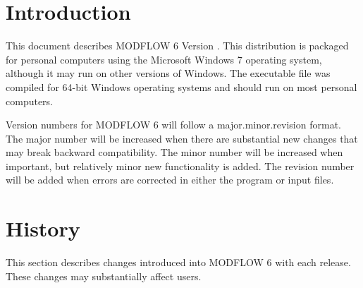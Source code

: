 \documentclass[11pt,twoside,twocolumn]{usgsreport}
\begin{document}
\ifdef{\makefrontcoveralt}{\makefrontcoveralt}{\makefrontcover}

\ifdef{\makefrontmatterabv}{\makefrontmatterabv}{\makefrontmatter}

\onecolumn
\pagestyle{body}
\RaggedRight
{}
\pagestyle{body}
\setlength{\parindent}{1.5pc}

\section{Introduction}
This document describes MODFLOW 6 Version \modflowversion.  This distribution is packaged for personal computers using the Microsoft Windows 7 operating system, although it may run on other versions of Windows.  The executable file was compiled for 64-bit Windows operating systems and should run on most personal computers.

Version numbers for MODFLOW 6 will follow a major.minor.revision format.  The major number will be increased when there are substantial new changes that may break backward compatibility.  The minor number will be increased when important, but relatively minor new functionality is added.  The revision number will be added when errors are corrected in either the program or input files.

\section{History}
This section describes changes introduced into MODFLOW 6 with each release.  These changes may substantially affect users.
\end{document}
